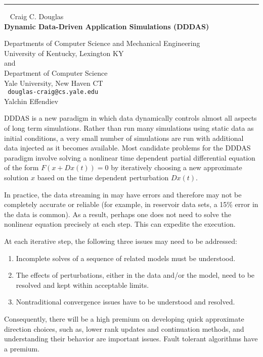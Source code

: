 \documentclass{report}
\begin{document}
\begin{center}

\rule{6in}{1pt} \
{\large
Craig C. Douglas
\\ {\bf
Dynamic Data-Driven Application Simulations (DDDAS)
}}

Departments of Computer Science and Mechanical Engineering
\\
University of Kentucky, Lexington KY
\\
and
\\
Department of Computer Science \\ Yale University, New Haven CT
\\ {\tt
douglas-craig@cs.yale.edu
}
\\
Yalchin Effendiev
\end{center}

DDDAS is a new paradigm in which data dynamically controls almost all
aspects of long term simulations. Rather than run many simulations
using static data as initial conditions, a very small number of
simulations are run with additional data injected as it becomes
available. Most candidate problems for the DDDAS paradigm involve
solving a nonlinear time dependent partial differential equation of the
form
$F(x+Dx(t))=0$ by iteratively choosing a new approximate
solution $x$ based on the time dependent perturbation
$Dx(t)$.

In practice, the data streaming in may have errors and therefore may
not be completely accurate or reliable (for example, in reservoir data
sets, a 15\% error in the data is common). As a result, perhaps one does
not need to solve the nonlinear equation precisely at each step. This
can expedite the execution.

At each iterative step, the following three issues may need to be
addressed:
\begin{enumerate}
\item Incomplete solves of a sequence of related models must be
understood.
\item The effects of perturbations, either in the data and/or the
model, need to be resolved and kept within acceptable limits.
\item Nontraditional convergence issues have to be understood and
resolved.
\end{enumerate}

Consequently, there will be a high premium on developing quick
approximate direction choices, such as, lower rank updates and
continuation methods, and understanding their behavior are
important issues. Fault tolerant algorithms have a premium.
\end{document}
